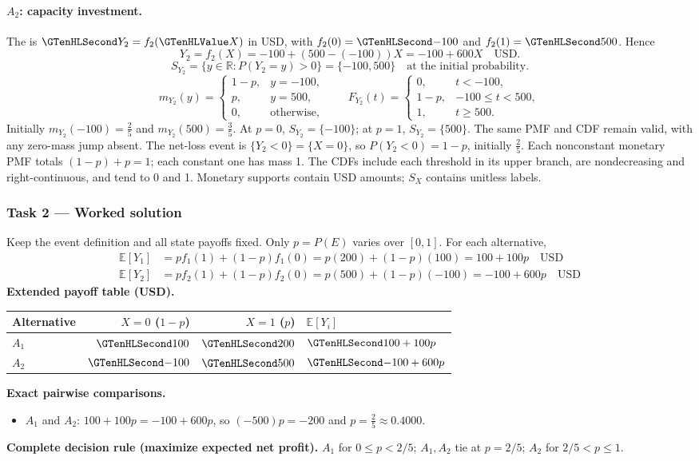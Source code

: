 \paragraph{$A_2$: capacity investment.}
The  is $\Money{Y_2}=f_2(\Indicator{X})$ in USD, with $f_2(0)=\Money{-100}$ and $f_2(1)=\Money{500}$. Hence
\[Y_2=f_2(X)=-100+(500-(-100))X=-100+600X\quad\text{USD}.\]
\[S_{Y_2}=\{y\in\mathbb R:P(Y_2=y)>0\}=\{-100,500\}\quad\text{at the initial probability}.\]
\[m_{Y_2}(y)=\begin{cases}1-p,&y=-100,\\p,&y=500,\\0,&\text{otherwise},\end{cases}\qquad F_{Y_2}(t)=\begin{cases}0,&t<-100,\\1-p,&-100\leq t<500,\\1,&t\geq 500.\end{cases}\]
Initially $m_{Y_2}(-100)=\frac{2}{5}$ and $m_{Y_2}(500)=\frac{3}{5}$. At $p=0$, $S_{Y_2}=\{-100\}$; at $p=1$, $S_{Y_2}=\{500\}$. The same PMF and CDF remain valid, with any zero-mass jump absent.
The net-loss event is $\{Y_2<0\}=\{X=0\}$, so $P(Y_2<0)=1-p$, initially $\frac{2}{5}$.
Each nonconstant monetary PMF totals $(1-p)+p=1$; each constant one has mass 1. The CDFs include each threshold in its upper branch, are nondecreasing and right-continuous, and tend to 0 and 1. Monetary supports contain USD amounts; $S_X$ contains unitless labels.
\clearpage\subsubsection*{Task 2 --- Worked solution}\label{sol:c3-manufacturing-decision}
Keep the event definition and all state payoffs fixed. Only $p=P(E)$ varies over $[0,1]$. For each alternative,
\begin{align*}
\mathbb E[Y_1]&=p f_1(1)+(1-p)f_1(0)=p(200)+(1-p)(100)=100+100p\quad\text{USD}\\
\mathbb E[Y_2]&=p f_2(1)+(1-p)f_2(0)=p(500)+(1-p)(-100)=-100+600p\quad\text{USD}
\end{align*}
\textbf{Extended payoff table (USD).}\begin{center}\begin{tabular}{lrrl}\toprule Alternative & $X=0$ ($1-p$) & $X=1$ ($p$) & $\mathbb E[Y_i]$\\\midrule
$A_1$ & $\Money{100}$ & $\Money{200}$ & $\Money{100+100p}$\\
$A_2$ & $\Money{-100}$ & $\Money{500}$ & $\Money{-100+600p}$\\
\bottomrule\end{tabular}\end{center}
\textbf{Exact pairwise comparisons.}\begin{itemize}
\item $A_1$ and $A_2$: $100+100p=-100+600p$, so $(-500)p=-200$ and $p=\frac{2}{5}\approx 0.4000$.
\end{itemize}
\textbf{Complete decision rule (maximize expected net profit).} $A_1$ for $0\leq p<2/5$; $A_1,A_2$ tie at $p=2/5$; $A_2$ for $2/5<p\leq1$.

